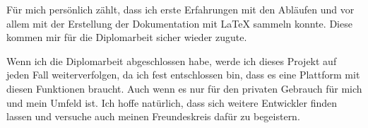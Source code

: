 Für mich persönlich zählt, dass ich erste Erfahrungen mit den Abläufen und
vor allem mit der Erstellung der Dokumentation mit LaTeX sammeln
konnte. Diese kommen mir für die Diplomarbeit sicher wieder zugute.

Wenn ich die Diplomarbeit abgeschlossen habe, werde ich dieses 
Projekt auf jeden Fall weiterverfolgen, da ich fest entschlossen bin, dass es
eine Plattform mit diesen Funktionen braucht. Auch wenn es nur für den privaten
Gebrauch für mich und mein Umfeld ist. Ich hoffe natürlich, dass sich weitere
Entwickler finden lassen und versuche auch meinen Freundeskreis dafür zu begeistern.